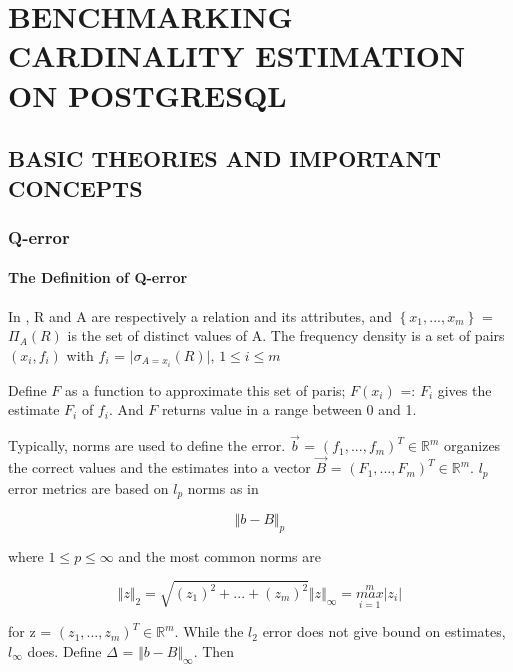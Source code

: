 
\chapter{BENCHMARKING CARDINALITY ESTIMATION ON POSTGRESQL}\label{chapter:Benchmarking CE}

\section{BASIC THEORIES AND IMPORTANT CONCEPTS}

\subsection{Q-error}

\subsubsection{The Definition of Q-error}

In \cite{q-error}, R and A are respectively a relation and its attributes, and $\left\{x_{1},...,x_{m}\right\}$ = ${{\Pi}_{A}\left(R\right)}$ is the set of distinct values of A. The frequency density is a set of pairs ${\left(x_{i},f_{i}\right)}$ with $f_{i}$ = $\vert{\sigma_{A=x_i}\left(R\right)}\vert$, ${{1}\le{i}\le{m}}$

Define $F$ as a function to approximate this set of paris; $F\left(x_{i}\right)$ =: $F_{i}$ gives the estimate $F_{i}$ of $f_{i}$. And $F$ returns value in a range between 0 and 1.

Typically, norms are used to define the error. $\vec{b}$ = ${{\left(f_{1},...,f_{m}\right)}^{T}}\in{{\mathbb{R}}^{m}}$ organizes the correct values and the estimates into a vector $\vec{B}$ = ${{\left(F_{1},...,F_{m}\right)}^{T}}\in{{\mathbb{R}}^{m}}$. $l_{p}$ error metrics are based on $l_{p}$ norms as in 

\[
\Vert{b-B}\Vert_{p}
\]

where ${{1}\le{p}\le{\infty}}$ and the most common norms are 

\[
{\Vert{z}\Vert}_{2} = \sqrt{{\left(z_{1}\right)}^{2} +...+ {\left(z_{m}\right)}^{2}}
{\Vert{z}\Vert}_{\infty} =  \overset{m}{\underset{i=1}{max}}{\vert{z_{i}}\vert}
\]

for z = ${{\left(z_{1},...,z_{m}\right)}^{T}}\in{{\mathbb{R}}^{m}}$. While the $l_{2}$ error does not give bound on estimates, $l_{\infty}$ does. Define $\Delta$ = ${\Vert{b-B}\Vert}_{\infty}$. Then 

